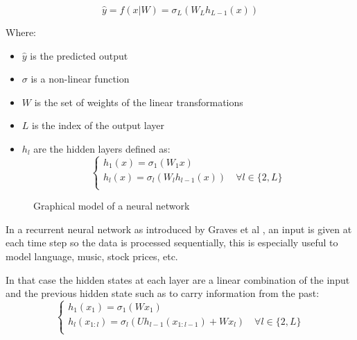 \documentclass[11pt,oneside,openright]{report}
\begin{document}
$$ \hat{y} = f(x | W) = \sigma_L (W_L h_{L-1}(x)) $$

Where:
\begin{itemize}
\item $\hat{y}$ is the predicted output
\item $\sigma$ is a non-linear function
\item $W$ is the set of weights of the linear transformations
\item $L$ is the index of the output layer
\item $h_l$ are the hidden layers defined as:
  \begin{equation}
    \begin{cases}
          h_1(x) = \sigma_1(W_1 x)\\
          h_l(x) = \sigma_l (W_l h_{l-1}(x)) \quad \forall l \in \{2, L\}\\
    \end{cases}
  \end{equation}
\end{itemize}

\begin{figure}[H]
\centering
{}
\caption{Graphical model of a neural network}
\end{figure}

In a recurrent neural network as introduced by Graves et al \cite{graves}, an input is given at each time step so the data is processed sequentially, this is especially useful to model language, music, stock prices, etc.

In that case the hidden states at each layer are a linear combination of the input and the previous hidden state such as to carry information from the past:
  \begin{equation}
    \begin{cases}
          h_1(x_1) = \sigma_1(W x_1) \\
          h_l(x_{1:l}) = \sigma_l (U h_{l-1}(x_{1:l-1}) + W x_l) \quad \forall l \in \{2, L\}\\
    \end{cases}
  \end{equation}
\end{document}
